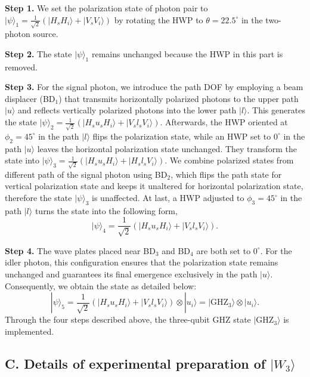 \documentclass[prl,aps,notitlepage,superscriptaddress,showpacs,nofootinbib]{revtex4-2}
\newcommand{\red}[1]{{\color{red} #1}}
\begin{document}
\textbf{Step 1.} We set \red{the} polarization state of photon pair to  $|\psi\rangle_1=\frac{1}{\sqrt{2}}(|H_sH_i\rangle+|V_sV_i\rangle)$ by rotating the HWP to $\theta=22.5^\circ$ in the two-photon source. 

\textbf{Step 2.} The state $|\psi\rangle_1$ remains unchanged because the HWP in this part is removed.

\textbf{Step 3.} For the signal photon, we introduce the path DOF by employing a beam displacer (BD$_1$) that transmits horizontally polarized photons to the upper path $|u\rangle$ and reflects vertically polarized photons into the lower path $|l\rangle$. This generates the state $|\psi\rangle_2=\frac{1}{\sqrt{2}}(|H_su_sH_i\rangle+|V_sl_sV_i\rangle)$. Afterwards, the HWP oriented at $\phi_2=45^\circ$ in the path $|l\rangle$ flips the polarization state, while \red{an} HWP set to $0^\circ$ in the path $|u\rangle$ leaves the horizontal polarization state unchanged. They transform the state into $|\psi\rangle_3=\frac{1}{\sqrt{2}}(|H_su_sH_i\rangle+|H_sl_sV_i\rangle)$. We combine polarized states from different path of \red{the} signal photon using BD$_2$, which flips the path state for vertical polarization state and \red{keeps} it unaltered for horizontal polarization state, therefore the state $|\psi\rangle_3$ is unaffected. At last, a HWP adjusted to $\phi_3=45^\circ$ in the path $|l\rangle$ turns the state into the following \red{form},
\begin{equation}
	|\psi\rangle_4=\frac{1}{\sqrt{2}}(|H_su_sH_i\rangle+|V_sl_sV_i\rangle).
\end{equation}

\textbf{Step 4.} The wave plates placed near BD$_3$ and BD$_4$ are both set to $0^\circ$. For the idler photon, this configuration ensures that the polarization state remains unchanged and guarantees its final emergence exclusively in the path $|u\rangle$. Consequently, we obtain the state as detailed below:
\begin{equation}
	|\psi\rangle_5=\frac{1}{\sqrt{2}}(|H_su_sH_i\rangle+|V_sl_sV_i\rangle)\otimes|u_i\rangle=|\text{GHZ}_3\rangle\otimes|u_i\rangle.
\end{equation}
Through the four steps described above, the three-qubit GHZ state $|\text{GHZ}_3\rangle$ is implemented.

\subsection{C. Details of experimental preparation of $|W_3\rangle$}
\end{document}

